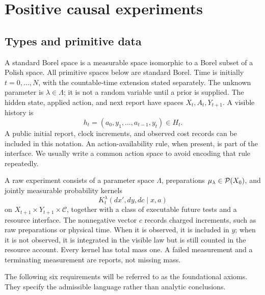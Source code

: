 \section{Positive causal experiments}\label{sec:experiments}
\subsection{Types and primitive data}
A standard Borel space is a measurable space isomorphic to a Borel subset of
a Polish space. All primitive spaces below are standard Borel. Time is
initially $t=0,\ldots,N$, with the countable-time extension stated
separately. The unknown parameter is $\lambda\in\Lambda$; it is not a
random variable until a prior is supplied. The hidden state, applied action,
and next report have spaces $X_t,A_t,Y_{t+1}$. A visible history is
\[
 h_t=(a_0,y_1,\ldots,a_{t-1},y_t)\in H_t.
\]
A public initial report, clock increments, and observed cost records can be
included in this notation. An action-availability rule, when present, is
part of the interface. We usually write a common action space to avoid
encoding that rule repeatedly.

\begin{definition}\label{def:experiment}
A raw experiment consists of a parameter space $\Lambda$, preparations
$\mu_\lambda\in\mathcal P(X_0)$, and jointly measurable probability kernels
\begin{equation}\label{eq:raw-kernel}
 K_t^\lambda(dx',dy,dc\mid x,a)
\end{equation}
on $X_{t+1}\times Y_{t+1}\times\mathcal C$, together with a class of
executable future tests and a resource interface. The nonnegative vector
$c$ records charged increments, such as raw preparations or physical time.
When it is observed, it is included in $y$; when it is not observed, it is
integrated in the visible law but is still counted in the resource account.
Every kernel has total mass one. A failed measurement and a terminating
measurement are reports, not missing mass.
\end{definition}

The following six requirements will be referred to as the foundational
axioms. They specify the admissible language rather than analytic conclusions.

